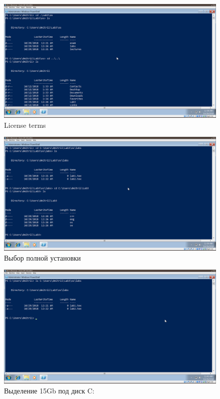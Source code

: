 \documentclass[a4paper]{article}
\begin{document}
\begin{figure}[H]
    \centering
    \includegraphics[width=\linewidth]{11.png}
    \caption{License terms}
\end{figure}

\begin{figure}[H]
    \centering
    \includegraphics[width=\linewidth]{12.png}
    \caption{Выбор полной установки}
\end{figure}

\begin{figure}[H]
    \centering
    \includegraphics[width=\linewidth]{14.png}
    \caption{Выделение 15Gb под диск C:}
\end{figure}    
\end{document}
